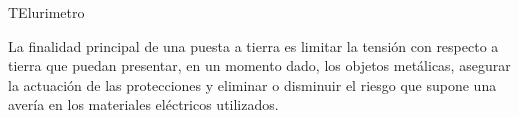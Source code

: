 TElurimetro

La finalidad principal de una puesta a tierra es limitar la tensión con respecto a tierra que puedan presentar, en un momento dado, los objetos metálicas, asegurar la actuación de las protecciones y eliminar o disminuir el riesgo que supone una avería en los materiales eléctricos utilizados.







\begin{table}[H]
    \centering
        \def\tablename{Tabla} 
        \caption{Mediciones del instrumento patrón y el mayor error absoluto}
        \label{tab:exp1a}
\end{table}